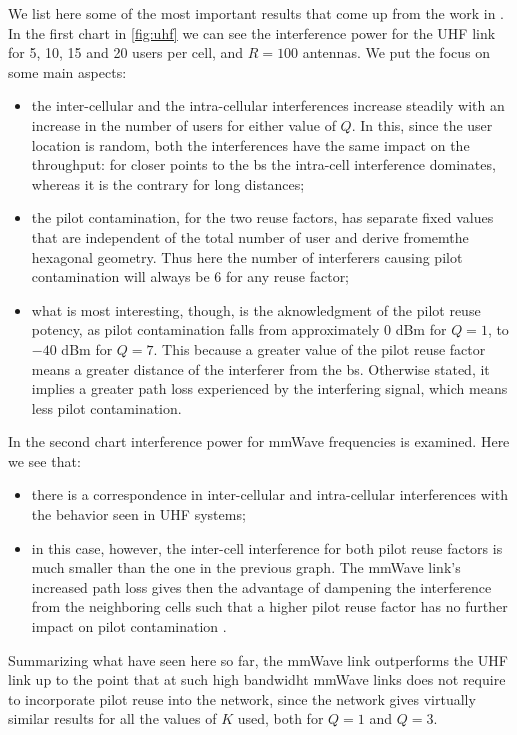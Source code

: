 \documentclass[11pt]{book}
\begin{document}
We list here some of the most important results that come up from the work in \cite{Ahsan2016}. In the first chart in \autoref{fig:uhf} we can see the interference power for the UHF link for 5, 10, 15 and 20 users per cell, and $R = 100$ antennas. We put the focus on some main aspects:
\begin{itemize}
  \item the inter-cellular and the intra-cellular interferences
  increase steadily with an increase in the number of users for
  either value of $Q$. In this, since the user location is random, both the interferences have the same impact on the throughput: for closer points to the \gls{bs} the intra-cell interference dominates, whereas it is the contrary for long distances;
  \item the pilot contamination, for the two reuse factors, has separate fixed values that are independent of the total number of user and derive fromemthe hexagonal geometry. Thus here the number of interferers causing pilot contamination will always be $6$ for any reuse factor;
  \item what is most interesting, though, is the aknowledgment of the pilot reuse potency, as pilot contamination falls from approximately $0$ dBm for $Q=1$, to $-40$ dBm for $Q=7$. This because a greater value of the pilot reuse factor means a greater distance of the interferer from the \gls{bs}. Otherwise stated, it implies a greater path loss experienced by the interfering signal, which means less pilot contamination.
\end{itemize}
In the second chart interference power for mmWave frequencies is examined. Here we see that:
\begin{itemize}
  \item there is a correspondence in inter-cellular and intra-cellular interferences with the behavior seen in UHF systems;
  \item in this case, however, the inter-cell interference for both pilot reuse factors is much smaller than the one in the previous graph. The mmWave link’s increased path loss gives then the advantage of dampening the interference from the neighboring cells such that a higher pilot reuse factor has no further impact on pilot contamination \cite{Ahsan2016}.
\end{itemize}

Summarizing what have seen here so far, the mmWave link outperforms the UHF link up to the point that at such high bandwidht mmWave links does not require to incorporate pilot reuse into the network, since the network gives virtually similar results for all the values of $K$ used, both for $Q = 1$ and $Q=3$.
\end{document}
